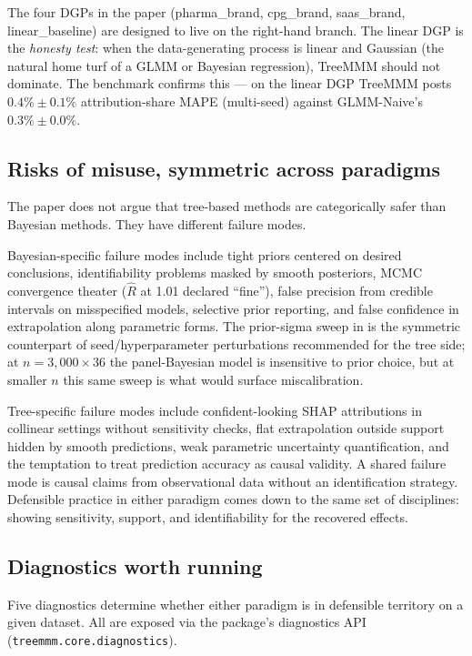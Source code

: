 \documentclass[review,12pt]{elsarticle}
\begin{document}
The four DGPs in the paper (pharma\_brand, cpg\_brand, saas\_brand,
linear\_baseline) are designed to live on the right-hand branch. The linear
DGP is the \emph{honesty test}: when the data-generating process is linear and
Gaussian (the natural home turf of a GLMM or Bayesian regression), TreeMMM
should not dominate. The benchmark confirms this --- on the linear DGP TreeMMM
posts $0.4\% \pm 0.1\%$ attribution-share MAPE (multi-seed) against
GLMM-Naive's $0.3\% \pm 0.0\%$.

\subsection{Risks of misuse, symmetric across paradigms}
\label{sec:intro:risks}

The paper does not argue that tree-based methods are categorically safer than
Bayesian methods. They have different failure modes.

Bayesian-specific failure modes include tight priors centered on desired
conclusions, identifiability problems masked by smooth posteriors, MCMC
convergence theater ($\hat{R}$ at 1.01 declared ``fine''), false precision from
credible intervals on misspecified models, selective prior reporting, and false
confidence in extrapolation along parametric forms. The prior-sigma sweep in
 is the symmetric counterpart of seed/hyperparameter
perturbations recommended for the tree side; at $n = 3{,}000 \times 36$ the
panel-Bayesian model is insensitive to prior choice, but at smaller
$n$ this same sweep is what would surface miscalibration.

Tree-specific failure modes include confident-looking SHAP attributions in
collinear settings without sensitivity checks, flat extrapolation outside
support hidden by smooth predictions, weak parametric uncertainty
quantification, and the temptation to treat prediction accuracy as causal
validity. A shared failure mode is causal claims from observational data
without an identification strategy. Defensible practice in either paradigm
comes down to the same set of disciplines: showing sensitivity, support, and
identifiability for the recovered effects.

\subsection{Diagnostics worth running}
\label{sec:intro:diagnostics}

Five diagnostics determine whether either paradigm is in defensible territory
on a given dataset. All are exposed via the package's diagnostics API
(\texttt{treemmm.core.diagnostics}).
\end{document}
